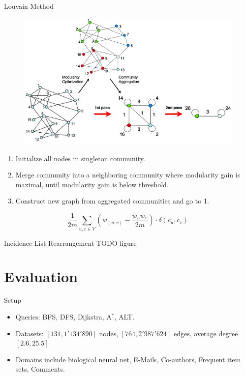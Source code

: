 \documentclass[rgb]{beamer}
\begin{document}
        \begin{frame}[allowframebreaks]{Louvain Method}
            \begin{figure}
                \begin{center}
                \includegraphics[keepaspectratio, height=0.8\textheight, width=.8\textwidth]{img/louvain.png}
                \end{center}
            \end{figure}
            
            \framebreak
            
            \begin{enumerate}
             \item Initialize all nodes in singleton community.
             \item Merge community into a neighboring community where modularity gain is maximal, until modularity gain is below threshold.
             \item Construct new graph from aggregated communities and go to 1.
            \end{enumerate}
            \vspace{2em}
            \[ \frac{1}{2m} \sum_{u,v \in V} \left( w_{(u, v)} - \frac{w_u w_v}{2m} \right) \cdot \delta (c_u, c_v) \]
            
        \end{frame}
    
        \begin{frame}{Incidence List Rearrangement}
            TODO figure

        \end{frame}
        
    \section{Evaluation}
        \begin{frame}{Setup}
        \begin{itemize}
         \item Queries: BFS, DFS, Dijkstra, A$^*$, ALT. \\ [1em]
         \item Datasets: $[131, 1'134'890]$ nodes, $[764, 2'987'624]$ edges, average degree $[2.6, 25.5]$ \\ [1em]
         \item Domains include biological neural net, E-Mails, Co-authors, Frequent item sets, Comments.
        \end{itemize}
        \end{frame}
        
\end{document}
